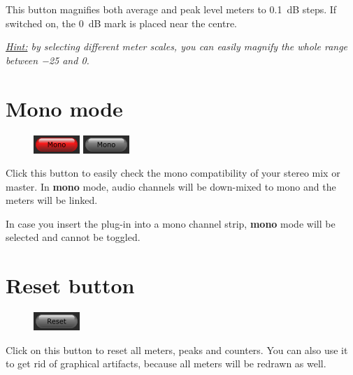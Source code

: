 This button magnifies both average and peak level meters to
\SI{0.1}{\dB} steps.  If switched on, the \SI{0}{\dB} mark is placed
near the centre.

\emph{\underline{Hint:} by selecting different meter scales, you can
  easily magnify the whole range between \SI{-25}{\dBFS} and
  \SI{0}{\dBFS}.}

\newpage %

\section{Mono mode}

\begin{figure}
  \includegraphics[scale=\screenshotscale,clip]{include/images/button_mono_on.png}
  \newline \vspace{-0.9\baselineskip}
  \includegraphics[scale=\screenshotscale,clip]{include/images/button_mono_off.png}
\end{figure}

Click this button to easily check the mono compatibility of your
stereo mix or master.  In \textbf{mono} mode, audio channels will be
down-mixed to mono and the meters will be linked.

In case you insert the plug-in into a mono channel strip,
\textbf{mono} mode will be selected and cannot be toggled.

\section{Reset button}

\begin{figure}
  \includegraphics[scale=\screenshotscale,clip]{include/images/button_reset.png}
\end{figure}

Click on this button to reset all meters, peaks and counters.  You can
also use it to get rid of graphical artifacts, because all meters will
be redrawn as well.


